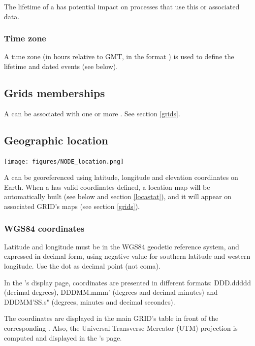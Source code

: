 The lifetime of a  has potential impact on processes that use this  or associated data.


\subsubsection{Time zone}

A time zone (in hours relative to GMT, in the format ) is used to define the lifetime and dated events (see below).

\subsection{Grids memberships}

A  can be associated with one or more . See section \ref{grids}.

\subsection{Geographic location}

\texttt{[image: figures/NODE\_location.png]}

A  can be georeferenced using latitude, longitude and elevation coordinates on Earth. When a  has valid coordinates defined, a location map will be automatically built (see below and section \ref{locastat}), and it will appear on associated GRID's maps (see section \ref{grids}).

\subsubsection{WGS84 coordinates}

Latitude and longitude must be in the WGS84 geodetic reference system, and expressed in decimal form, using negative value for southern latitude and western longitude. Use the dot as decimal point (not coma).

In the 's display page, coordinates are presented in different formats: DDD.ddddd (decimal degrees), DDD\degree MM.mmm' (degrees and decimal minutes) and DDD\degree MM'SS.s" (degrees, minutes and decimal secondes).

The coordinates are displayed in the main GRID's table in front of the corresponding . Also, the Universal Transverse Mercator (UTM) projection is computed and displayed in the 's page.

